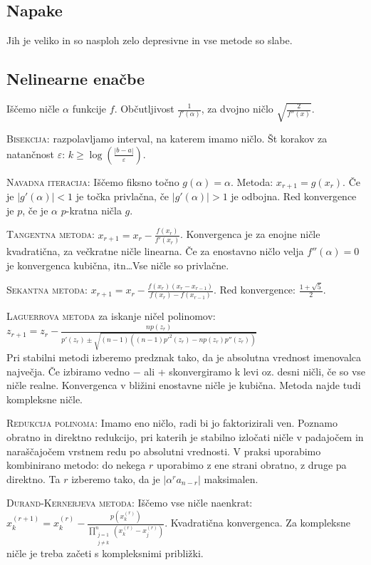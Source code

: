 \documentclass[a4paper,10pt]{article}
\title{\mytitle}
\author{Jure Slak}
\date{\today}
\theoremstyle{definition}
\begin{document}
\subsection*{Napake}
Jih je veliko in so nasploh zelo depresivne in vse metode so slabe.

\subsection*{Nelinearne enačbe}
Iščemo ničle $\alpha$ funkcije $f$. Občutljivost $\frac{1}{f'(\alpha)}$, za
dvojno ničlo $\sqrt{\frac{2}{f''(x)}}$.

\textsc{Bisekcija:} razpolavljamo interval, na katerem imamo ničlo. Št korakov za
natančnost $\varepsilon$: $k \geq \log\left(\frac{|b-a|}{\varepsilon}\right)$.

\textsc{Navadna iteracija:} Iščemo fiksno točno $g(\alpha) = \alpha$. Metoda: $x_{r+1} =
g(x_r)$. Če je $|g'(\alpha)| < 1$ je točka privlačna, če $|g'(\alpha)| > 1$ je
odbojna. Red konvergence je $p$, če je $\alpha$ $p$-kratna ničla $g$.

\textsc{Tangentna metoda:} $x_{r+1} = x_r - \frac{f(x_r)}{f'(x_r)}$. Konvergenca je za
enojne ničle kvadratična, za večkratne ničle linearna. Če za enostavno ničlo
velja $f''(\alpha) = 0$ je konvergenca kubična, itn\dots Vse ničle so privlačne.

\textsc{Sekantna metoda:} $x_{r+1} = x_r - \frac{f(x_r)(x_r - x_{r-1})}{f(x_r) -
f(x_{r-1})}$. Red konvergence: $\frac{1+\sqrt{5}}{2}$.

\textsc{Laguerrova metoda} za iskanje ničel polinomov: $z_{r+1} = z_r -
\frac{np(z_r)}{p'(z_r) \pm \sqrt{(n-1)((n-1)p'^2(z_r) - np(z_r)p''(z_r))}}$ \\
Pri stabilni metodi izberemo predznak tako, da je absolutna vrednost imenovalca
največja. Če izbiramo vedno $-$ ali  + skonvergiramo k levi oz. desni ničli, če
so vse ničle realne. Konvergenca v bližini enostavne ničle je kubična. Metoda
najde tudi kompleksne ničle.

\textsc{Redukcija polinoma:} Imamo eno ničlo, radi bi jo faktorizirali ven.
Poznamo obratno in direktno redukcijo, pri katerih je stabilno izločati ničle v
padajočem in naraščajočem vrstnem redu po absolutni vrednosti. V praksi
uporabimo kombinirano metodo: do nekega $r$ uporabimo z ene strani obratno, z
druge pa direktno. Ta $r$ izberemo tako, da je $|\alpha^ra_{n-r}|$ maksimalen.

\textsc{Durand-Kernerjeva metoda:} Iščemo vse ničle naenkrat: $x_k^{(r+1)} =
x_k^{(r)} - \frac{p(x_k^{(r)})}{\prod_{\substack{j=1 \\ j \neq
k}}^n (x_k^{(r)} - x_j^{(r)})}$. Kvadratična konvergenca. Za kompleksne ničle je
treba začeti s kompleksnimi približki.
\end{document}
